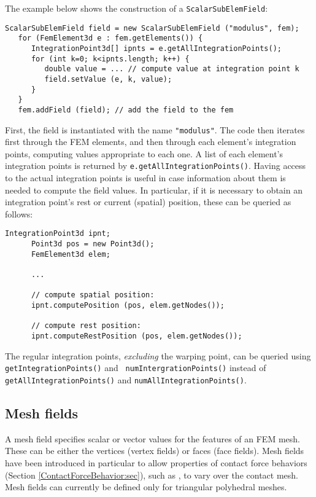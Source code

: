 The example below shows the construction of a {\tt ScalarSubElemField}:
%
\begin{lstlisting}[]
   ScalarSubElemField field = new ScalarSubElemField ("modulus", fem);
   for (FemElement3d e : fem.getElements()) {
      IntegrationPoint3d[] ipnts = e.getAllIntegrationPoints();
      for (int k=0; k<ipnts.length; k++) {
         double value = ... // compute value at integration point k
         field.setValue (e, k, value);
      }
   }
   fem.addField (field); // add the field to the fem
\end{lstlisting}
%
First, the field is instantiated with the name {\tt "modulus"}.  The
code then iterates first through the FEM elements, and then through
each element's integration points, computing values appropriate to
each one. A list of each element's integration points is returned by
{\tt e.getAllIntegrationPoints()}. Having access to the actual
integration points is useful in case information about them is needed
to compute the field values. In particular, if it is necessary to
obtain an integration point's rest or current (spatial) position,
these can be queried as follows:
%
\begin{lstlisting}[]
      IntegrationPoint3d ipnt;
      Point3d pos = new Point3d();
      FemElement3d elem;

      ...

      // compute spatial position:
      ipnt.computePosition (pos, elem.getNodes());

      // compute rest position:
      ipnt.computeRestPosition (pos, elem.getNodes());
\end{lstlisting}
%

\begin{sideblock}
The regular integration points, {\it excluding} the warping point, can
be queried using {\tt getIntegrationPoints()} and {\tt
numIntergrationPoints()} instead of {\tt getAllIntegrationPoints()}
and {\tt numAllIntegrationPoints()}.
\end{sideblock}

\subsection{Mesh fields}
\label{sec:meshFields}

A mesh field specifies scalar or vector values for the features of an
FEM mesh. These can be either the vertices (vertex fields) or faces
(face fields). Mesh fields have been introduced in particular to allow
properties of contact force behaviors
(Section \ref{ContactForceBehavior:sec}), such as 
,
to vary over the contact mesh. Mesh fields can currently be defined
only for triangular polyhedral meshes.

